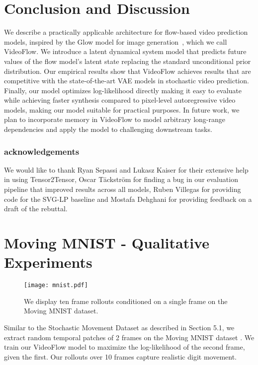 \documentclass{article} \usepackage{iclr2020_conference,times}
\begin{document}
\section{Conclusion and Discussion}
We describe a practically applicable architecture for flow-based video prediction models, inspired by the Glow model for image generation~\cite{kingma2018glow}, which we call VideoFlow. We introduce a latent dynamical system model that predicts future values of the flow model's latent state replacing the standard unconditional prior distribution. Our empirical results show that VideoFlow achieves results that are competitive with the state-of-the-art VAE models in stochastic video prediction. Finally, our model optimizes log-likelihood directly making it easy to evaluate while achieving faster synthesis compared to pixel-level autoregressive video models, making our model suitable for practical purposes.
In future work, we plan to incorporate memory in VideoFlow to model arbitrary long-range dependencies and apply the model to challenging downstream tasks.

\subsubsection*{acknowledgements}

We would like to thank Ryan Sepassi and Lukasz Kaiser for their extensive help in using Tensor2Tensor, Oscar T\"ackstr\"om for finding a bug in our evaluation pipeline that improved results across all models, Ruben Villegas for providing code for the SVG-LP baseline and Mostafa Dehghani for providing feedback on a draft of the rebuttal. 



 

\appendix

\section{Moving MNIST - Qualitative Experiments}

\begin{figure}[h]
\centering
\texttt{[image: mnist.pdf]}
\caption{We display ten frame rollouts conditioned on a single frame on the Moving MNIST dataset.}
\label{mnist}
\end{figure}

Similar to the Stochastic Movement Dataset as described in Section 5.1, we extract random temporal patches of 2 frames on the Moving MNIST dataset \citep{srivastava2015unsupervised}. We train our VideoFlow model to maximize the log-likelihood of the second frame, given the first. Our rollouts over 10 frames capture realistic digit movement. 
\end{document}
